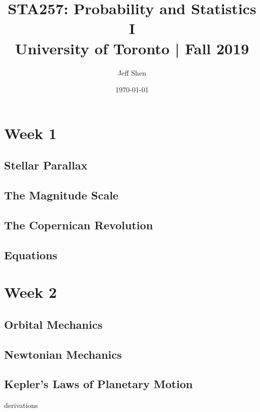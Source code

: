 \documentclass[a4paper,10pt]{article}
\begin{document}
\title{STA257: Probability and Statistics I\\
    \Large University of Toronto | Fall 2019}
\author{Jeff Shen}
\date{\today}
\maketitle
\tableofcontents



\newpage
\section{Week 1}

\subsection{Stellar Parallax}

\subsection{The Magnitude Scale}

\subsection{The Copernican Revolution}

\subsection{Equations}


\newpage
\section{Week 2}

\subsection{Orbital Mechanics}

\subsection{Newtonian Mechanics}

\subsection{Kepler's Laws of Planetary Motion}
derivations
\end{document}
